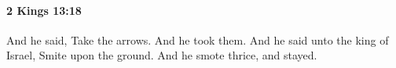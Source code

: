 
		\paragraph{2 Kings 13:18} %
			\label{2KINGS-13-18}

			And he said, Take the arrows. And he took them. And he said unto the king of Israel, Smite upon the ground. And he smote thrice, and stayed.


